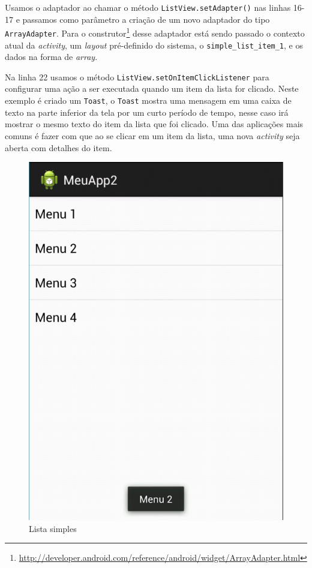 \documentclass[a4paper,12pt,brazil]{book}
\begin{document}
\begin{singlespace}
Usamos o adaptador ao chamar o método \texttt{ListView.setAdapter()} nas linhas 16-17  e passamos como parâmetro a criação de um novo adaptador do tipo \texttt{ArrayAdapter}. Para o construtor\footnote{\href{http://developer.android.com/reference/android/widget/ArrayAdapter.html}{http://developer.android.com/reference/android/widget/ArrayAdapter.html}} desse adaptador está sendo passado o contexto atual da \emph{activity}, um \emph{layout} pré-definido do sistema, o \texttt{simple\_list\_item\_1}, e os dados na forma de \emph{array}.

Na linha 22 usamos o método \texttt{ListView.setOnItemClickListener} para configurar uma ação a ser executada quando um item da lista for clicado. Neste exemplo é criado um \texttt{Toast}, o \texttt{Toast} mostra uma mensagem em uma caixa de texto na parte inferior da tela por um curto período de tempo, nesse caso irá mostrar o mesmo texto do item da lista que foi clicado. Uma das aplicações mais comuns é fazer com que ao se clicar em um item da lista, uma nova \emph{activity} seja aberta com detalhes do item.

\begin{figure}[H]
  \centering
  \includegraphics[width=.7\textwidth]{figuras/design/lista.png}
  \caption{Lista simples}
  \label{fig:e}
\end{figure}


\end{singlespace}
\end{document}
